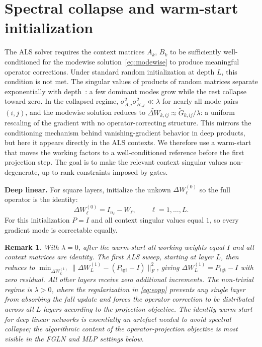 \documentclass{article}
\newtheorem{remark}[theorem]{Remark}
\newcommand{\Ptgt}{P_{\mathrm{tgt}}}
\begin{document}
\section{Spectral collapse and warm-start initialization}
\label{sec:warm-start}
The ALS solver requires the context matrices $A_k$, $B_k$ to be
sufficiently well-conditioned for the modewise
solution~\eqref{eq:modewise} to produce meaningful operator corrections.
Under standard random initialization at depth $L$, this condition is not met.
The singular values of products of random matrices separate exponentially with
depth~\cite{haas2026jacobian}: a few dominant modes grow while the rest
collapse toward zero.
In the collapsed regime, $\sigma_{A,i}^2 \sigma_{B,j}^2 \ll \lambda$ for
nearly all mode pairs $(i,j)$, and the modewise solution reduces to
$\widetilde{\Delta W}_{k,ij} \approx \widetilde G_{k,ij} / \lambda$: a
uniform rescaling of the gradient with no operator-correcting structure.
This mirrors the conditioning mechanism behind vanishing-gradient behavior in
deep products, but here it appears directly in the ALS contexts.
%
We therefore use a warm-start that moves the working factors to a well-conditioned reference before the first projection step. The goal is to make the relevant context singular values non-degenerate, up to rank constraints imposed by gates.

\textbf{Deep linear.}
For square layers, initialize the unkown $\Delta W_\ell^{(0)}$ so the full operator is the identity:
\begin{equation}
  \Delta W_\ell^{(0)} = I_{n_\ell} - W_\ell, \qquad \ell = 1, \dots, L.
  \label{eq:warm-start-linear}
\end{equation}
For this initialization $P = I$ and all context singular values equal $1$, so
every gradient mode is correctable equally.

\begin{remark}
  With $\lambda = 0$, after the warm-start all working weights equal $I$ and
  all context matrices are identity.
  The first ALS sweep, starting at layer $L$, then reduces to
  $\min_{\Delta W_L^{(1)}} \|\Delta W_L^{(1)} - (\Ptgt - I)\|_F^2$,
  giving $\Delta W_L^{(1)} = \Ptgt - I$ with zero residual.
  All other layers receive zero additional increments.
  The non-trivial regime is $\lambda > 0$, where the regularization in
  \eqref{eq:eopp} prevents any single layer from absorbing the full update
  and forces the operator correction to be distributed across all $L$ layers
  according to the projection objective.
  The identity warm-start for deep linear networks is essentially an artefact needed to avoid spectral collapse; the algorithmic content
  of the operator-projection objective is most visible in the FGLN and MLP
  settings below.
\end{remark}
\end{document}
